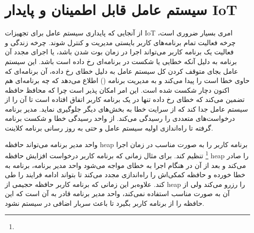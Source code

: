 \documentclass[10pt, a4paper]{article}
\begin{document}
\section{سیستم عامل قابل اطمینان و پایدار IoT}

از آنجایی که پایداری سیستم عامل برای تجهیزات IoT امری بسیار ضروری است، چرخه
فعالیت تمام برنامه‌های کاربر بایستی مدیریت و کنترل شوند. چرخه زندگی و فعالیت یک
برنامه کاربر می‌تواند اجرا در زمان بوت شدن باشد، یا اجرای مجدد آن برنامه به دلیل
آنکه خطایی یا شکست در برنامه‌ای رخ داده است باشد. این سیستم عامل بجای متوقف کردن
کل سیستم عامل به دلیل خطای رخ داده، آن برنامه‌ای که حاوی خطا است را پیدا می‌کند
و به مدیریت برنامه () اطلاع می‌دهد که چه برنامه‌ای هم اکنون
دچار شکست شده است. این امر امکان پذیر است چرا که محافظ حافظه تضمین می‌کند که
خطای رخ داده تنها در یک برنامه کاربر اتفاق افتاده است تا آن را از سیستم عامل جدا
کند که از سرایت خطا به بخش‌های دیگر جلوگیری نماید. مدیر برنامه درخواست‌های
متعددی را رسیدگی می‌کند. از واحد رسیدگی خطا و شکست برنامه گرفته تا را‌ه‌اندازی
اولیه سیستم عامل و حتی به روز رسانی برنامه کلاینت.

واحد مدیر برنامه می‌تواند حافظه heap برنامه کاربر را به صورت مناسب در زمان اجرا
\footnote{} تنظیم کند. برای مثال زمانی که برنامه کاربر درخواست
افزایش حافظه heap را صادر می‌کند و بعد از آن در هنگام اجرا به خطای 
مواجه می‌شود واحد مدیر برنامه، برنامه به خطا خورده و حافظه کمکی‌اش را راه‌اندازی
مجدد می‌کند تا بتواند ادامه فرایند را طی کند. علاوه‌بر این زمانی که برنامه کاربر
حافظه حجیمی از heap را رزرو می‌کند ولی از آن به صورت مناسب استفاده نمی‌کند، واحد
مدیر برنامه قادر به آن است که این حافظه را از برنامه کاربر بگیرد تا باعث سربار
اضافی در سیستم نشود.




\end{document}
